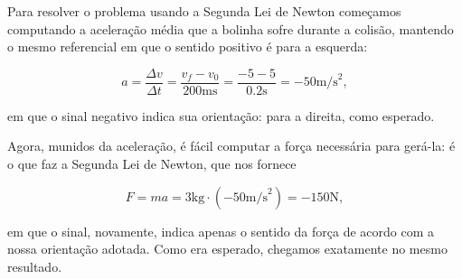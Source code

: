 \begin{exemplo}[Nível I]
\begin{enumerate}
    Para resolver o problema usando a Segunda Lei de Newton começamos computando a aceleração média que a bolinha sofre durante a colisão, mantendo o mesmo referencial em que o sentido positivo é para a esquerda:

    $$ a = \dfrac{\Delta v}{\Delta t} = \dfrac{v_f-v_0}{200 \text{ms}} = \dfrac{-5-5}{0.2 \text{s}} =-50 \text{m/s}^2,$$

    \noindent em que o sinal negativo indica sua orientação: para a direita, como esperado.

    Agora, munidos da aceleração, é fácil computar a força necessária para gerá-la: é o que faz a Segunda Lei de Newton, que nos fornece

    $$ F = ma = 3 \text{kg} \cdot (-50\text{m/s}^2) = -150 \text{N},$$

    \noindent em que o sinal, novamente, indica apenas o sentido da força de acordo com a nossa orientação adotada. Como era esperado, chegamos exatamente no mesmo resultado.
    
\end{enumerate}


\end{exemplo}


\vspace{0.3cm}


